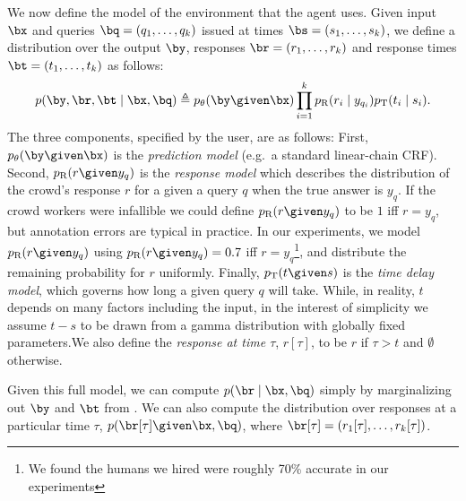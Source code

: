 We now define the model of the environment that the agent uses.
Given input $\bx$ and queries $\bq = (q_1, \dots, q_k)$ issued at times $\bs = (s_1, \dots, s_k)$,
we define a distribution over the output $\by$, responses $\br = (r_1, \dots, r_k)$
and response times $\bt = (t_1, \dots, t_k)$ as follows:
\begin{align}
  \label{eqn:dynamics}
p(\by, \br, \bt \mid \bx, \bq) \eqdef \p(\by \given \bx) \prod_{i=1}^k \presp(r_i \mid y_{q_i}) \ptime(t_i \mid s_i).
\end{align}
The three components, specified by the user, are as follows:
First, $\p(\by \given \bx)$ is the \emph{prediction model} (e.g.\ a standard linear-chain CRF).
Second, $\presp(r \given y_q)$ is the \emph{response model} which describes the distribution of the crowd's response $r$ for a given a query $q$ when the true answer is $y_q$.
%
If the crowd workers were infallible we could define $\presp(r \given y_q)$ to be $1$ iff $r = y_q$, but annotation errors are typical in practice. 
In our experiments, we model $\presp(r \given y_q)$ using $\presp(r \given y_q) = 0.7$ iff $r = y_q$\footnote{ We found the humans we hired were roughly 70\% accurate in our experiments}, and distribute the remaining probability for $r$ uniformly.
%
Finally, $\ptime(t \given s)$ is the \emph{time delay model}, which governs how long a given query $q$ will take. While, in reality, $t$ depends on many factors including the input, in the interest of simplicity we assume $t - s$ to be drawn from a gamma distribution with globally fixed parameters.We also define the \emph{response at time $\tau$}, $r[\tau]$, to be $r$ if $\tau > t$ and $\emptyset$ otherwise.

Given this full model, we can compute $p(\br \mid \bx, \bq)$ simply by marginalizing out $\by$ and $\bt$ from .
We can also compute the distribution over responses at a particular time $\tau$, $p(\br[\tau] \given \bx, \bq)$, where $\br[\tau] = (r_1[\tau], \ldots, r_k[\tau])$.


